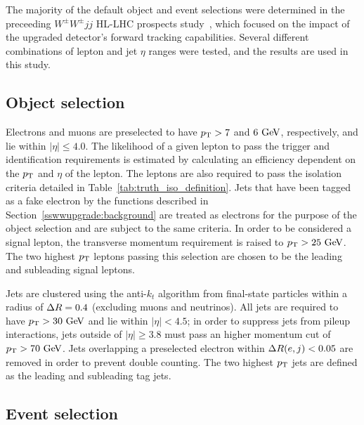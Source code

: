 The majority of the default object and event selections were determined in the preceeding $W^{\pm}W^{\pm}jj$ HL-LHC prospects study~\cite{2017.ssww-upgrade}, which focused on the impact of the upgraded detector's forward tracking capabilities.
Several different combinations of lepton and jet $\eta$ ranges were tested, and the results are used in this study. 

\subsection{Object selection}\label{sswwupgrade:object_selection}
Electrons and muons are preselected to have $p_{\mathrm{T}} > 7$ and $6\gev$, respectively, and lie within $|\eta| \le 4.0$.
The likelihood of a given lepton to pass the trigger and identification requirements is estimated by calculating an efficiency dependent on the $p_{\mathrm{T}}$ and $\eta$ of the lepton.
The leptons are also required to pass the isolation criteria detailed in Table~\ref{tab:truth_iso_definition}.
Jets that have been tagged as a fake electron by the functions described in Section~\ref{sswwupgrade:background} are treated as electrons for the purpose of the object selection and are subject to the same criteria.
In order to be considered a signal lepton, the transverse momentum requirement is raised to $\pt > 25\gev$.
The two highest $p_{\mathrm{T}}$ leptons passing this selection are chosen to be the leading and subleading signal leptons.

Jets are clustered using the anti-$k_t$ algorithm from final-state particles within a radius of $\Delta R = 0.4$ (excluding muons and neutrinos).
All jets are required to have $\pt > 30\gev$ and lie within $|\eta| < 4.5$; in order to suppress jets from pileup interactions, jets outside of $|\eta| \ge 3.8$ must pass an higher momentum cut of $\pt > 70\gev$.
Jets overlapping a preselected electron within $\Delta R(e,j) < 0.05$ are removed in order to prevent double counting.
The two highest $p_{\mathrm{T}}$ jets are defined as the leading and subleading tag jets.


\subsection{Event selection}\label{sswwupgrade:event_selection}

